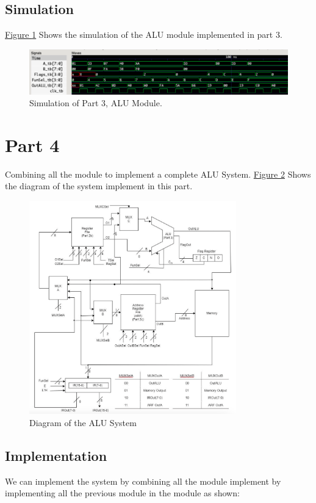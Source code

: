\documentclass[pdftex,12pt,a4paper]{article}
\begin{document}
\subsection{Simulation}
\hyperref[fig:part3_sim]{Figure \ref{fig:part3_sim}} Shows the simulation of the ALU module implemented in part 3.

\begin{figure}[H]
\centering
\includegraphics[width=1\textwidth]{part3_sim.png}
\caption{Simulation of Part 3, ALU Module.}
\label{fig:part3_sim}
\end{figure}
\pagebreak
\section{Part 4}
Combining all the module to implement a complete ALU System. \hyperref[fig:part4_diagram]{Figure \ref{fig:part4_diagram}} Shows the diagram of the system implement in this part.

\begin{figure}[H]
\centering
\includegraphics[width=0.8\textwidth]{part4_diagram.png}
\caption{Diagram of the ALU System}
\label{fig:part4_diagram} 
\end{figure}

\subsection{Implementation}
We can implement the system by combining all the module implement by implementing all the previous module in the module as shown:
\end{document}
